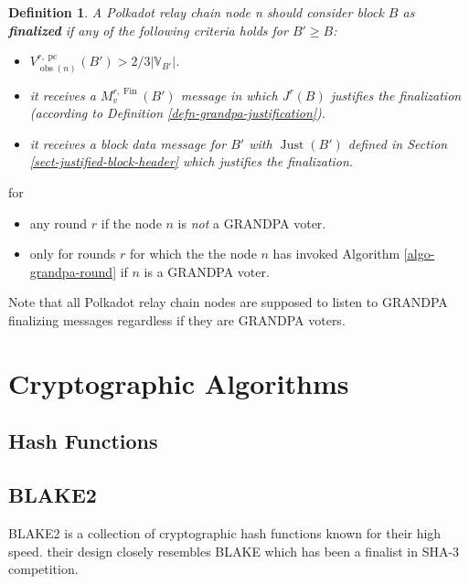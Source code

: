 \documentclass{book}
\newcommand{\nosymbol}{}
\newcommand{\tmem}[1]{{\em #1\/}}
\newcommand{\tmop}[1]{\ensuremath{\operatorname{#1}}}
\newcommand{\tmstrong}[1]{\textbf{#1}}
\newcommand{\tmtextbf}[1]{{\bfseries{#1}}}
\newcommand{\tmtextit}[1]{{\itshape{#1}}}
\newenvironment{itemizedot}{\begin{itemize} \renewcommand{\labelitemi}{$\bullet$}\renewcommand{\labelitemii}{$\bullet$}\renewcommand{\labelitemiii}{$\bullet$}\renewcommand{\labelitemiv}{$\bullet$}}{\end{itemize}}
\newtheorem{definition}{Definition}
\providecommand{\nosymbol}{}
\providecommand{\tmem}[1]{\tmtextit{#1}}
\providecommand{\tmop}[1]{\ensuremath{\mathrm{#1}}}
\providecommand{\tmstrong}[1]{\tmtextbf{#1}}
\providecommand{\tmtextbf}[1]{\tmtextbf{#1}}
\providecommand{\tmtextit}[1]{\tmtextit{#1}}
\newtheorem{definition}{Definition}
\begin{document}
\begin{definition}
  \label{defn-finalized-block}A Polkadot relay chain node n should consider
  block $B$ as {\tmstrong{finalized}} if any of the following criteria holds
  for $B' \geqslant B$:
  \begin{itemize}
    \item $V^{r, \tmop{pc}}_{\tmop{obs} (n)}^{\nosymbol}_{\nosymbol} (B') > 2
    / 3 |\mathbb{V}_{B'} |$.
    
    \item it receives a $M_v^{r, \tmop{Fin}} (B')$ message in which $J^r (B)$
    justifies the finalization (according to Definition
    \ref{defn-grandpa-justification}).
    
    \item it receives a block data message for $B'$ with $\tmop{Just} (B')$
    defined in Section \ref{sect-justified-block-header} which justifies the
    finalization. 
  \end{itemize}
\end{definition}

for
\begin{itemizedot}
  \item any round $r$ if the node $n$ is {\tmem{not}} a GRANDPA voter.
  
  \item only for rounds $r$ for which the the node $n$ has invoked Algorithm
  \ref{algo-grandpa-round} if $n$ is a GRANDPA voter.
\end{itemizedot}
Note that all Polkadot relay chain nodes are supposed to listen to GRANDPA
finalizing messages regardless if they are GRANDPA
voters.\appendix\chapter{Cryptographic Algorithms}

\section{Hash Functions}\label{sect-hash-functions}

\section{BLAKE2}\label{sect-blake2}

BLAKE2 is a collection of cryptographic hash functions known for their high
speed. their design closely resembles BLAKE which has been a finalist in SHA-3
competition.
\end{document}
